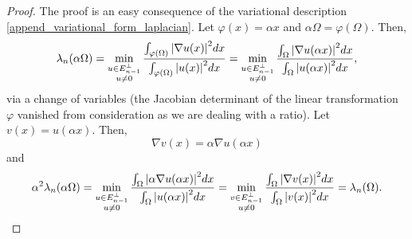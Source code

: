 \begin{proof}
    The proof is an easy consequence of the variational description \eqref{append_variational_form_laplacian}. Let \(\varphi(x) = \alpha x\) and \(\alpha \Omega = \varphi(\Omega)\). Then,
    \begin{equation*}
        \lambda_n(\alpha \Omega) = \min_{\substack{u \in E^\perp_{n-1} \\ u \neq 0}}  \frac{\int_{\varphi(\Omega)} \abs{\nabla u(x)}^2 dx}{\int_{\varphi(\Omega)} \abs{u(x)}^2 dx} = \min_{\substack{u \in E^\perp_{n-1} \\ u \neq 0}} \frac{\int_{\Omega} \abs{\nabla u(\alpha x)}^2 dx}{\int_{\Omega} \abs{u(\alpha x)}^2 dx},
    \end{equation*}
    via a change of variables (the Jacobian determinant of the linear transformation \(\varphi\) vanished from consideration as we are dealing with a ratio). Let \(v(x) = u(\alpha x)\). Then,
    \[
        \nabla v(x) = \alpha \nabla u (\alpha x)
    \]
    and
    \begin{equation*}
        \alpha^2\lambda_n(\alpha \Omega) = \min_{\substack{u \in E^\perp_{n-1} \\ u \neq 0}} \frac{\int_{\Omega} \abs{\alpha\nabla u(\alpha x)}^2 dx}{\int_{\Omega} \abs{u(\alpha x)}^2 dx} = \min_{\substack{v \in E^\perp_{n-1} \\ u \neq 0}} \frac{\int_{\Omega} \abs{\nabla v(x)}^2 dx}{\int_{\Omega} \abs{v(x)}^2 dx} = \lambda_n(\Omega).
    \end{equation*}
    
\end{proof}



